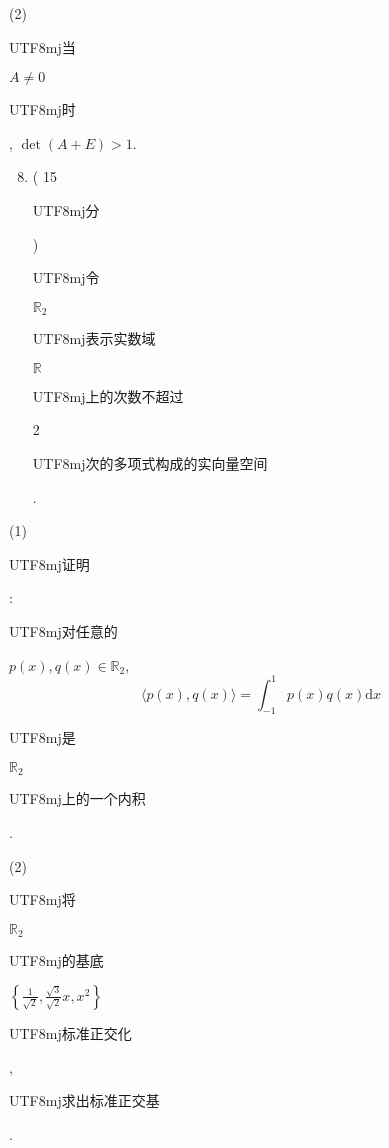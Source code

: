 \documentclass[10pt]{article}
\begin{document}
(2) \begin{CJK}{UTF8}{mj}当\end{CJK} $A \neq 0$ \begin{CJK}{UTF8}{mj}时\end{CJK}, $\operatorname{det}(A+E)>1$.

\begin{enumerate}
  \setcounter{enumi}{7}
  \item ( 15 \begin{CJK}{UTF8}{mj}分\end{CJK}) \begin{CJK}{UTF8}{mj}令\end{CJK} $\mathbb{R}_{2}$ \begin{CJK}{UTF8}{mj}表示实数域\end{CJK} $\mathbb{R}$ \begin{CJK}{UTF8}{mj}上的次数不超过\end{CJK} 2 \begin{CJK}{UTF8}{mj}次的多项式构成的实向量空间\end{CJK}.
\end{enumerate}
(1) \begin{CJK}{UTF8}{mj}证明\end{CJK}: \begin{CJK}{UTF8}{mj}对任意的\end{CJK} $p(x), q(x) \in \mathbb{R}_{2}$,
$$
\langle p(x), q(x)\rangle=\int_{-1}^{1} p(x) q(x) \mathrm{d} x
$$
\begin{CJK}{UTF8}{mj}是\end{CJK} $\mathbb{R}_{2}$ \begin{CJK}{UTF8}{mj}上的一个内积\end{CJK}.

(2) \begin{CJK}{UTF8}{mj}将\end{CJK} $\mathbb{R}_{2}$ \begin{CJK}{UTF8}{mj}的基底\end{CJK} $\left\{\frac{1}{\sqrt{2}}, \frac{\sqrt{3}}{\sqrt{2}} x, x^{2}\right\}$ \begin{CJK}{UTF8}{mj}标准正交化\end{CJK}, \begin{CJK}{UTF8}{mj}求出标准正交基\end{CJK}.
\end{document}
